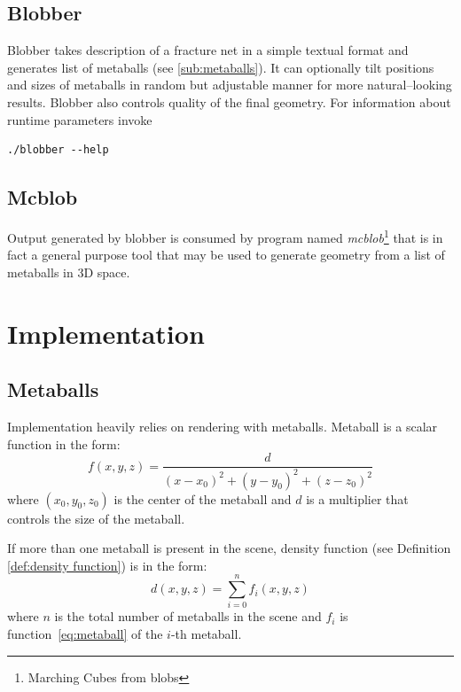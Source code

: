 \subsection{Blobber}
Blobber takes description of a fracture net in a simple textual format and
generates list of metaballs (see \autoref{sub:metaballs}). It can
optionally tilt positions and sizes of metaballs in random but adjustable manner
for more natural--looking results. Blobber also controls quality of the final
geometry. For information about runtime parameters invoke
\begin{verbatim}
./blobber --help
\end{verbatim}

\subsection{Mcblob}
Output generated by blobber is consumed by program named \emph{mcblob}\footnote{Marching
Cubes from blobs} that is in fact a general purpose tool that may be used to
generate geometry from a list of metaballs in 3D space.
\section{Implementation}
\subsection{Metaballs}
Implementation heavily relies on rendering with metaballs. Metaball is a scalar
function in the form:
\begin{equation}
  f(x,y,z)=\frac{d}{(x-x_0)^2+(y-y_0)^2+(z-z_0)^2}
  \label{eq:metaball}
\end{equation}
where $(x_0,y_0,z_0)$ is the center of the metaball and $d$ is a multiplier that
controls the size of the metaball.

If more than one metaball is present in the scene, density function (see Definition
\autoref{def:density function})
is in the form:
\begin{equation}
  d(x,y,z) = \sum_{i=0}^{n} f_i(x,y,z)
  \label{eq:metaballdensity}
\end{equation}
where $n$ is the total number of metaballs in the scene and $f_i$ is function~\ref{eq:metaball}
of the $i$-th metaball.

